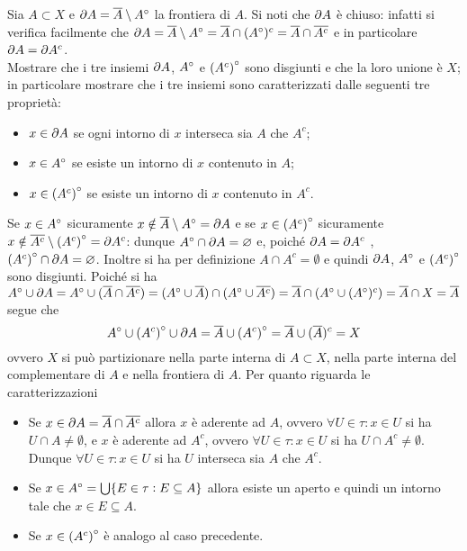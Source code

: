 \begin{es}
  Sia $ A \subset X $ e $ \partial{A} = \overline{A} \setminus {A}^{\circ} $ la frontiera di $ A $. Si noti che $ \partial{A} $ è chiuso: infatti si verifica facilmente che $ \partial{A} = \overline{A} \setminus {A}^{\circ} = \overline{A} \cap ({A}^{\circ})^c = \overline{A} \cap \overline{A^c} $ e in particolare $ \partial{A} = \partial{A^c} $. \\
  Mostrare che i tre insiemi $ \partial{A} $, $ {A}^{\circ} $ e $ {(A^c)}^{\circ} $ sono disgiunti e che la loro unione è $ X $; in particolare mostrare che i tre insiemi sono caratterizzati dalle seguenti tre proprietà:
  \begin{itemize}
  \item $ x \in \partial{A} $ se ogni intorno di $ x $ interseca sia $ A $ che $ A^c $;
  \item $ x \in {A}^{\circ} $ se esiste un intorno di $ x $ contenuto in $ A $;
  \item $ x \in {(A^c)}^{\circ} $ se esiste un intorno di $ x $ contenuto in $ A^c $.
  \end{itemize}
\end{es}
%
Se $ x \in {A}^{\circ} $ sicuramente $ x \notin \overline{A} \setminus {A}^{\circ} = \partial{A} $ e se $ x \in {(A^c)}^{\circ} $ sicuramente $ x \notin \overline{A^c} \setminus {(A^c)}^{\circ} = \partial{A^c} $: dunque $ {A}^{\circ} \cap \partial{A} = \varnothing $ e, poiché $ \partial{A} = \partial{A^c} $ , $ {(A^c)}^{\circ} \cap \partial{A} = \varnothing $. Inoltre si ha per definizione $ A \cap A^c  = \emptyset$ e quindi $ \partial{A} $, $ {A}^{\circ} $ e $ {(A^c)}^{\circ} $ sono disgiunti. Poiché si ha $ {A}^{\circ} \cup \partial{A} = {A}^{\circ} \cup (\overline{A} \cap \overline{A^c}) = ({A}^{\circ} \cup \overline{A}) \cap ({A}^{\circ} \cup \overline{A^c}) = \overline{A} \cap ({A}^{\circ} \cup ({A}^{\circ})^c) = \overline{A} \cap X = \overline{A} $ segue che
\[{A}^{\circ} \cup {(A^c)}^{\circ} \cup \partial{A} = \overline{A} \cup {(A^c)}^{\circ} = \overline{A} \cup (\overline{A})^c = X\]
ovvero $ X $ si può partizionare nella parte interna di $ A \subset X $, nella parte interna del complementare di $ A $ e nella frontiera di $ A $. Per quanto riguarda le caratterizzazioni
\begin{itemize}
\item Se $ x \in \partial{A} = \overline{A} \cap \overline{A^c} $ allora $ x $ è aderente ad $ A $, ovvero $ \forall U \in \tau : x \in U $ si ha $ U \cap A \neq \emptyset $, e $ x $ è aderente ad $ A^c $, ovvero $ \forall U \in \tau : x \in U $ si ha $ U \cap A^c \neq \emptyset $. Dunque $ \forall U \in \tau : x \in U $ si ha $ U $ interseca sia $ A $ che $ A^c $.
\item Se $ x \in {A}^{\circ} = \bigcup \{E \in \tau : E \subseteq A\} $ allora esiste un aperto e quindi un intorno tale che $ x \in E \subseteq A $.
\item Se $ x \in {(A^c)}^{\circ} $ è analogo al caso precedente.
\end{itemize}

